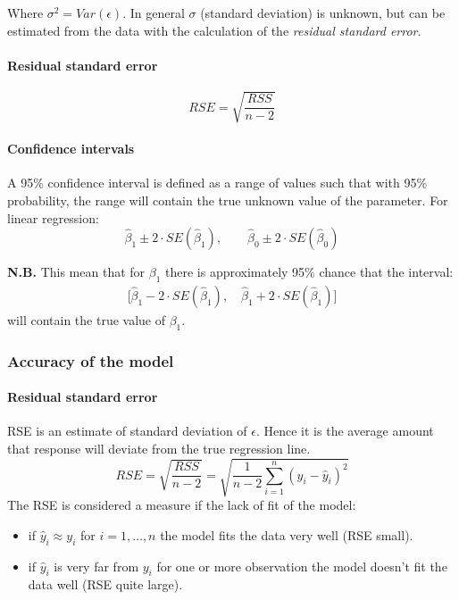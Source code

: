 \documentclass[a4paper]{article}
\begin{document}
				Where $\sigma^2 = Var(\epsilon)$. In general $\sigma$ (standard deviation) is unknown, but can be estimated from the data with the calculation of the \textit{residual standard error}.
				
				\paragraph{Residual standard error}
				\begin{equation}
					RSE = \sqrt{\frac{RSS}{n - 2}}
				\end{equation}		
				
				\paragraph{Confidence intervals}
					A 95\% confidence interval is defined as a range of values such that with 95\% probability, the range will contain the true unknown value of the parameter.
					For linear regression:
					\begin{equation}
						\hat{\beta}_1 \pm 2 \cdot SE(\hat{\beta}_1), \quad \quad
						\hat{\beta}_0 \pm 2 \cdot SE(\hat{\beta}_0)						
					\end{equation}
					
					
					\textbf{N.B.} This mean that for $\beta_1$ there is approximately 95\% chance that the interval:
					\begin{align*}
						\Big[ \hat{\beta}_1 - 2 \cdot SE(\hat{\beta}_1), \quad \hat{\beta}_1 + 2 \cdot SE(\hat{\beta}_1) \Big]
					\end{align*}																			will contain the true value of $\beta_1$.
						
			\subsubsection{Accuracy of the model}	
				
				\paragraph{Residual standard error}	
					RSE is an estimate of standard deviation of $\epsilon$. Hence it is the average amount that response will deviate from the true regression line.
				\begin{equation}\label{eq:RSE}
					RSE = \sqrt{\frac{RSS}{n - 2}} = \sqrt{\frac{1}{n - 2} \sum_{i=1}^n (y_i - \hat{y}_i)^2}
				\end{equation}
				The RSE is considered a measure if the lack of fit of the model:
				\begin{itemize}
					\item if $\hat{y}_i \approx y_i$ for $i = 1,\dots, n$ the model fits the data very well (RSE small).
					\item if $\hat{y}_i$ is very far from $y_i$ for one or more observation the model doesn't fit the data well (RSE quite large).
				\end{itemize}
								
\end{document}
